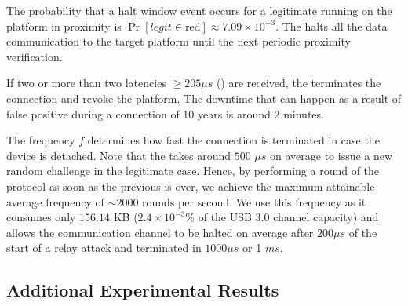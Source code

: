 

The probability that a halt window event occurs for a legitimate \app running on the platform in proximity is $\Pr[legit\in\text{red}]\approx 7.09\times10^{-3}$. The \device halts all the data communication to the target platform until the next periodic proximity verification.

If two or more than two latencies $\geq 205\mu s$ (\detach) are received, the \device terminates the connection and revoke the platform. The downtime that can happen as a result of false positive during a connection of 10 years is around $2$ minutes.


 The frequency $f$ determines how fast the connection is terminated in case the \device device is detached. Note that the \device takes around $500$ $\mu s$ on average to issue a new random challenge in the legitimate case. Hence, by performing a round of the protocol as soon as the previous is over, we achieve the maximum attainable average frequency of $\sim2000$ rounds per second. We use this frequency as it consumes only $156.14$ KB ($2.4\times 10^{-3}$\% of the USB 3.0 channel capacity) and allows the communication channel to be halted on average after $200 \mu s$ of the start of a relay attack and terminated in $1000 \mu s$ or 1 $ms$.



\subsection{Additional Experimental Results}
\label{appendix:ex}




